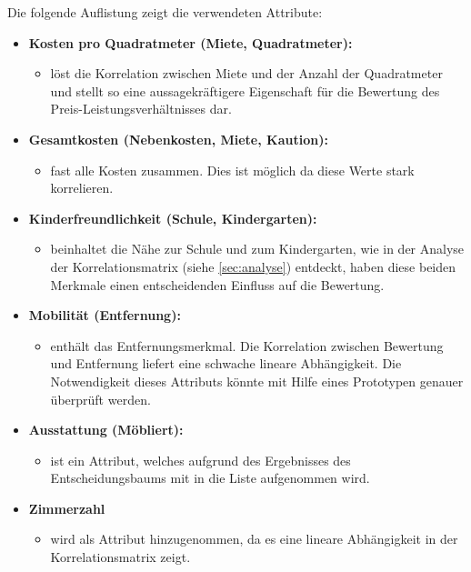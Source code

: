 Die folgende Auflistung zeigt die verwendeten Attribute:
\begin{itemize}\label{lst:Eigenschaften}
    \item \textbf{Kosten pro Quadratmeter (Miete, Quadratmeter):}
    \begin{itemize}
        \item löst die Korrelation zwischen Miete und der Anzahl der Quadratmeter und
        stellt so eine aussagekräftigere Eigenschaft für die Bewertung des Preis-Leistungsverhältnisses dar.
    \end{itemize}
    \item \textbf{Gesamtkosten (Nebenkosten, Miete, Kaution):}
    \begin{itemize}
        \item  fast alle Kosten zusammen. Dies ist möglich da diese Werte stark korrelieren.
    \end{itemize}
    \item \textbf{Kinderfreundlichkeit (Schule, Kindergarten):}
    \begin{itemize}
        \item beinhaltet die Nähe zur Schule und zum Kindergarten, wie in
        der Analyse der Korrelationsmatrix (siehe \autoref{sec:analyse}) entdeckt, haben diese beiden
        Merkmale einen entscheidenden Einfluss auf die Bewertung.
    \end{itemize}
    \item \textbf{Mobilität (Entfernung):}
    \begin{itemize}
        \item enthält das Entfernungsmerkmal. Die Korrelation zwischen Bewertung und Entfernung liefert eine schwache lineare
        Abhängigkeit. Die Notwendigkeit dieses Attributs könnte mit Hilfe eines Prototypen genauer überprüft werden.
    \end{itemize}
    \item \textbf{Ausstattung (Möbliert):}
    \begin{itemize}
        \item ist ein Attribut, welches aufgrund des Ergebnisses des Entscheidungsbaums
        mit in die Liste aufgenommen wird.
    \end{itemize}
    \item \textbf{Zimmerzahl}
    \begin{itemize}
        \item wird als Attribut hinzugenommen, da es eine lineare Abhängigkeit in der Korrelationsmatrix zeigt.
    \end{itemize}
\end{itemize}

